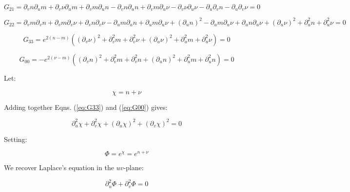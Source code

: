 \documentclass{article}
\begin{document}
\begin{equation}
G_{21}=\partial_{v}n\partial_{u}m+\partial_{v}\nu\partial_{u}m+\partial_{v}m\partial_{u}n-\partial_{v}n\partial_{u}n+\partial_{v}m\partial_{u}\nu-\partial_{v}\nu\partial_{u}\nu-\partial_{u}\partial_{v}n-\partial_{u}\partial_{v}\nu=0
\end{equation}


\begin{equation}
G_{22}=\partial_{v}m\partial_{v}n+\partial_{v}m\partial_{v}\nu+\partial_{v}n\partial_{v}\nu-\partial_{u}m\partial_{u}n+\partial_{u}m\partial_{u}\nu+\left(\partial_{u}n\right)^{2}-\partial_{u}m\partial_{u}\nu+\partial_{u}n\partial_{u}\nu+\left(\partial_{u}\nu\right)^{2}+\partial_{u}^{2}n+\partial_{u}^{2}\nu=0
\end{equation}

\begin{equation}
G_{33}=e^{2(n-m)}\left(\left(\partial_{v}\nu\right)^{2}+\partial_{v}^{2}m+\partial_{v}^{2}\nu+\left(\partial_{u}\nu\right)^{2}+\partial_{u}^{2}m+\partial_{u}^{2}\nu\right)=0\label{eq:G33}
\end{equation}


\begin{equation}
G_{00}=-e^{2(\nu-m)}\left(\left(\partial_{v}n\right)^{2}+\partial_{v}^{2}m+\partial_{v}^{2}n+\left(\partial_{u}n\right)^{2}+\partial_{u}^{2}m+\partial_{u}^{2}n\right)=0\label{eq:G00}
\end{equation}

Let:

\begin{equation}
\chi=n+\nu
\end{equation}


Adding together Eqns. (\ref{eq:G33}) and (\ref{eq:G00}) gives:

\begin{equation}
\partial_{u}^{2}\chi+\partial_{v}^{2}\chi+\left(\partial_{u}\chi\right)^{2}+\left(\partial_{v}\chi\right)^{2}=0
\end{equation}


Setting:

\begin{equation}
\Phi=e^{\chi}=e^{n+\nu}
\end{equation}


We recover Laplace's equation in the $uv$-plane:

\begin{equation}
\partial_{u}^{2}\Phi+\partial_{v}^{2}\Phi=0
\end{equation}
\end{document}

